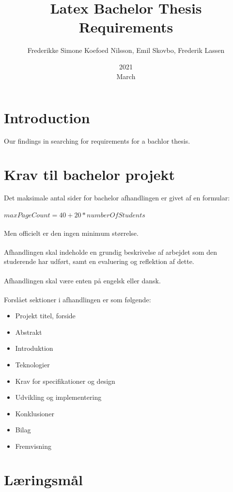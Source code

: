 \documentclass[a4paper,12pt]{article}
\title{Latex Bachelor Thesis Requirements}
\date{2021\\March}
\author{Frederikke Simone Koefoed Nilsson, Emil Skovbo, Frederik Lassen}
\begin{document}
\maketitle
\thispagestyle{empty}
\clearpage
{}

\tableofcontents
\clearpage

\section{Introduction}
Our findings in searching for requirements for a bachlor thesis.
\section{Krav til bachelor projekt} 

Det maksimale antal sider for bachelor afhandlingen er givet af en formular: \\ \\
$maxPageCount = 40 + 20 * numberOfStudents $ \\ \\
Men officielt er den ingen minimum størrelse. \\ \\
Afhandlingen skal indeholde en grundig beskrivelse af arbejdet som den studerende har udført, samt en evaluering og reflektion af dette. \\ \\
Afhandlingen skal være enten på engelsk eller dansk.\\ \\
Forslået sektioner i afhandlingen er som følgende\cite{cphbusinessBP}:

\begin{itemize}

\item Projekt titel, forside
\item Abstrakt
\item Introduktion
\item Teknologier
\item Krav for specifikationer og design
\item Udvikling og implementering
\item Konklusioner
\item Bilag
\item Fremvisning

\end{itemize}

\clearpage

\section{Læringsmål}
\end{document}
